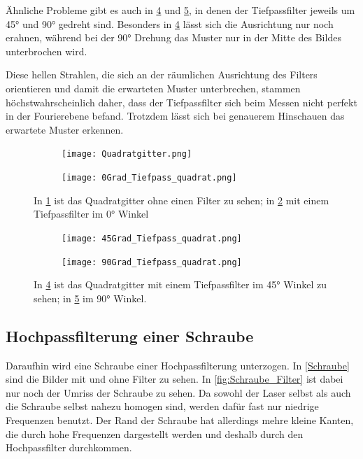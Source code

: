 Ähnliche Probleme gibt es auch in \cref{fig:45Gitter} und \cref{fig:90Gitter}, in denen der Tiefpassfilter jeweils um 45° und 90° gedreht sind. Besonders in \cref{fig:45Gitter} lässt sich die Ausrichtung nur noch erahnen, während bei der 90° Drehung das Muster nur in der Mitte des Bildes unterbrochen wird.

Diese hellen Strahlen, die sich an der räumlichen Ausrichtung des Filters orientieren und damit die erwarteten Muster unterbrechen, stammen höchstwahrscheinlich daher, dass der Tiefpassfilter sich beim Messen nicht perfekt in der Fourierebene befand. Trotzdem lässt sich bei genauerem Hinschauen das erwartete Muster erkennen.





\begin{figure}[h]
	\begin{subfigure}[c]{0.5\textwidth}
		
		\texttt{[image: Quadratgitter.png]}
		\caption{}
		\label{fig:Gitter}
		
	\end{subfigure}
	\begin{subfigure}[c]{0.5\textwidth}
		\texttt{[image: 0Grad\_Tiefpass\_quadrat.png]}
		\caption{}
		\label{fig:0Gitter}
	\end{subfigure}
	\caption{In \cref{fig:Gitter} ist das Quadratgitter ohne einen Filter zu sehen; in \cref{fig:0Gitter} mit einem Tiefpassfilter im 0° Winkel}
	\label{Gitter1}
\end{figure}  




\begin{figure}[h]
	\begin{subfigure}[c]{0.5\textwidth}
		
		\texttt{[image: 45Grad\_Tiefpass\_quadrat.png]}
		\caption{}
		\label{fig:45Gitter}
		
	\end{subfigure}
	\begin{subfigure}[c]{0.5\textwidth}
		\texttt{[image: 90Grad\_Tiefpass\_quadrat.png]}
		\caption{}
		\label{fig:90Gitter}
	\end{subfigure}
	\caption{In \cref{fig:45Gitter} ist das Quadratgitter mit einem Tiefpassfilter im 45° Winkel zu sehen; in \cref{fig:90Gitter} im 90° Winkel.}
	\label{blabla}
\end{figure}  




\subsection{Hochpassfilterung einer Schraube}
Daraufhin wird eine Schraube einer Hochpassfilterung unterzogen. In \cref{Schraube} sind die Bilder mit und ohne Filter zu sehen. In \cref{fig:Schraube_Filter} ist dabei nur noch der Umriss der Schraube zu sehen. Da sowohl der Laser selbst als auch die Schraube selbst nahezu homogen sind, werden dafür fast nur niedrige Frequenzen benutzt. Der Rand der Schraube hat allerdings mehre kleine Kanten, die durch hohe Frequenzen dargestellt werden und deshalb durch den Hochpassfilter durchkommen.

